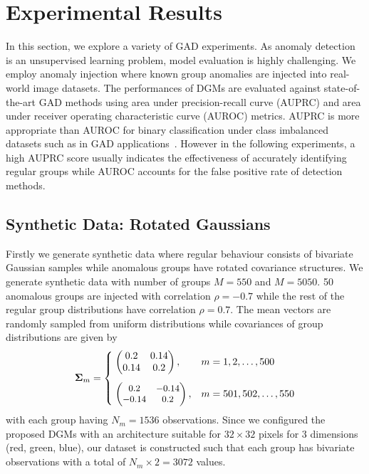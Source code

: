 \section{Experimental Results}
\label{sec:experiment-results}
In this section, we explore a variety of GAD experiments. As anomaly detection is an unsupervised learning problem, model evaluation is highly challenging. {  We employ anomaly injection where known group anomalies are injected into  real-world image datasets. The performances of DGMs are evaluated against state-of-the-art GAD methods using area under precision-recall curve (AUPRC) and area under receiver operating characteristic curve (AUROC) metrics. AUPRC  is  more appropriate  than AUROC for binary classification under class imbalanced datasets such as in GAD applications~\cite{Davis:2006}.
However in the following experiments, a high AUPRC score usually indicates the effectiveness of accurately identifying regular groups while AUROC accounts for the false positive rate of detection methods. %
}

\subsection{Synthetic Data: Rotated Gaussians }
Firstly we generate synthetic data where
regular behaviour consists of  bivariate Gaussian samples while anomalous groups have rotated covariance structures. %
We generate synthetic data with number of groups $M=550$ and $M=5050$. 50 anomalous groups are injected with correlation $\rho =-0.7$ while the rest of the regular group distributions have  correlation $\rho =0.7$.  The mean vectors are randomly sampled from uniform distributions %
 while covariances of group distributions are given by
 \begin{equation}
  \boldsymbol\Sigma_m=\left\{
  \begin{array}{@{}ll@{}}
  \;
\begin{pmatrix}
     0.2 & 0.14 \\
  0.14 & 0.2
  \end{pmatrix}, & m=1,2,\dots,500 \\[5mm]
  \;  \small \begin{pmatrix}
     0.2 & -0.14 \\
  -0.14 & 0.2
  \end{pmatrix}, &m=501,502,\dots,550 \end{array}\right.
    \label{changecovariance}
\end{equation}
with each group having $N_m = 1536$ observations.
{  Since we configured the proposed DGMs with an architecture suitable  for $32\times 32$ pixels for 3 dimensions (red, green, blue), our dataset is constructed such that each group has bivariate observations with a total of $N_m \times 2 = 3072$ values. }

